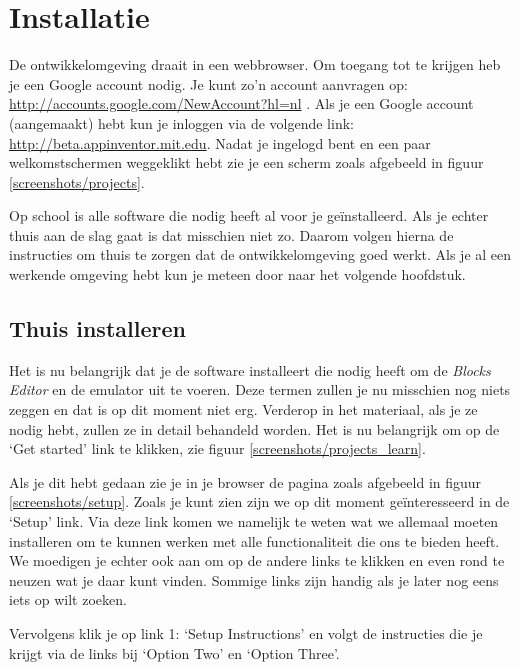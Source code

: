 \chapter{Installatie}

De \ai ontwikkelomgeving draait in een webbrowser. Om toegang tot \ai te krijgen heb je een Google account nodig. Je kunt zo'n account aanvragen op: \url{http://accounts.google.com/NewAccount?hl=nl} . Als je een Google account (aangemaakt) hebt kun je inloggen via de volgende link: \url{http://beta.appinventor.mit.edu}.
Nadat je ingelogd bent en een paar welkomstschermen weggeklikt hebt zie je een scherm zoals afgebeeld in figuur \ref{screenshots/projects}.

 
Op school is alle software die \ai nodig heeft al voor je ge\"installeerd. Als je echter thuis aan de slag gaat is dat misschien niet zo. Daarom volgen hierna de instructies om thuis te zorgen dat de \ai ontwikkelomgeving goed werkt. Als je al een werkende omgeving hebt kun je meteen door naar het volgende hoofdstuk. 

\section{Thuis installeren}
Het is nu belangrijk dat je de software installeert die \ai nodig heeft om de \emph{Blocks Editor} en de emulator uit te voeren. Deze termen zullen je nu misschien nog niets zeggen en dat is op dit moment niet erg. Verderop in het materiaal, als je ze nodig hebt, zullen ze in detail behandeld worden. Het is nu belangrijk om op de `Get started' link te klikken, zie figuur \ref{screenshots/projects_learn}.


Als je dit hebt gedaan zie je in je browser de pagina zoals afgebeeld in figuur \ref{screenshots/setup}. Zoals je kunt zien zijn we op dit moment ge\"interesseerd in de `Setup' link. Via deze link komen we namelijk te weten wat we allemaal moeten installeren om te kunnen werken met alle functionaliteit die \ai ons te bieden heeft.
We moedigen je echter ook aan om op de andere links te klikken en even rond te neuzen wat je daar kunt vinden. Sommige links zijn handig als je later nog eens iets op wilt zoeken.


Vervolgens klik je op link 1: `Setup Instructions' en volgt de instructies die je krijgt via de links bij `Option Two' en `Option Three'. 

